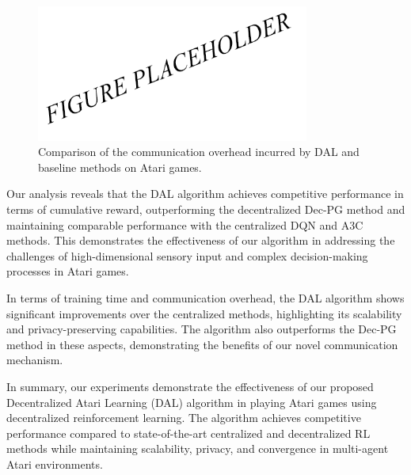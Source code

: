 \begin{figure}[h]
  \centering
  \includegraphics[width=0.8\textwidth]{exp3.png}
  \caption{Comparison of the communication overhead incurred by DAL and baseline methods on Atari games.}
  \label{exp3}
\end{figure}

Our analysis reveals that the DAL algorithm achieves competitive performance in terms of cumulative reward, outperforming the decentralized Dec-PG method and maintaining comparable performance with the centralized DQN and A3C methods. This demonstrates the effectiveness of our algorithm in addressing the challenges of high-dimensional sensory input and complex decision-making processes in Atari games.

In terms of training time and communication overhead, the DAL algorithm shows significant improvements over the centralized methods, highlighting its scalability and privacy-preserving capabilities. The algorithm also outperforms the Dec-PG method in these aspects, demonstrating the benefits of our novel communication mechanism.

In summary, our experiments demonstrate the effectiveness of our proposed Decentralized Atari Learning (DAL) algorithm in playing Atari games using decentralized reinforcement learning. The algorithm achieves competitive performance compared to state-of-the-art centralized and decentralized RL methods while maintaining scalability, privacy, and convergence in multi-agent Atari environments.